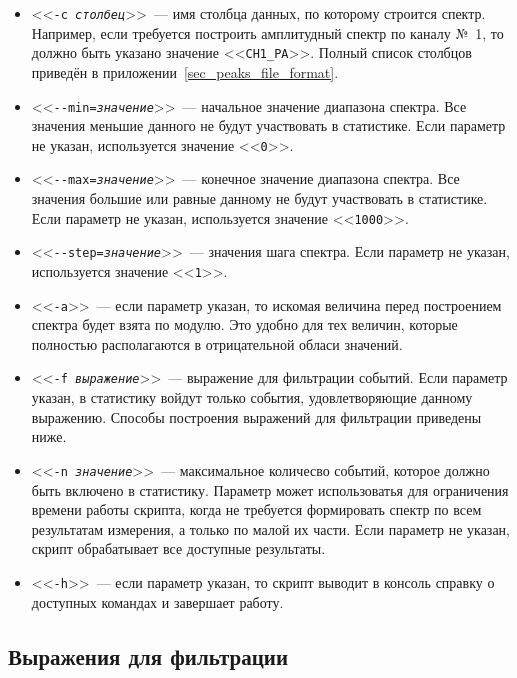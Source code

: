 \documentclass[12pt, a4paper, oneside, onecolumn]{book}
\newcommand{\CMDARG}[1]{<<{\tt #1}>>}
\begin{document}
\begin{itemize}

\item \CMDARG{-c {\it столбец}}~--- имя столбца данных, по которому строится спектр. Например, если требуется построить амплитудный спектр по каналу №~1, то должно быть указано значение \CMDARG{CH1\_PA}. Полный список столбцов приведён в приложении~\ref{sec_peaks_file_format}.

\item \CMDARG{-{}-min={\it значение}}~--- начальное значение диапазона спектра. Все значения меньшие данного не будут участвовать в статистике. Если параметр не указан, используется значение \CMDARG{0}.

\item \CMDARG{-{}-max={\it значение}}~--- конечное значение диапазона спектра. Все значения большие или равные данному не будут участвовать в статистике. Если параметр не указан, используется значение \CMDARG{1000}.

\item \CMDARG{-{}-step={\it значение}}~--- значения шага спектра. Если параметр не указан, используется значение \CMDARG{1}.

\item \CMDARG{-a}~--- если параметр указан, то искомая величина перед построением спектра будет взята по модулю. Это удобно для тех величин, которые полностью располагаются в отрицательной обласи значений.

\item \CMDARG{-f {\it выражение}}~--- выражение для фильтрации событий. Если параметр указан, в статистику войдут только события, удовлетворяющие данному выражению. Способы построения выражений для фильтрации приведены ниже.

\item \CMDARG{-n {\it значение}}~--- максимальное количесво событий, которое должно быть включено в статистику. Параметр может использоватья для ограничения времени работы скрипта, когда не требуется формировать спектр по всем результатам измерения, а только по малой их части. Если параметр не указан, скрипт обрабатывает все доступные результаты.

\item \CMDARG{-h}~--- если параметр указан, то скрипт выводит в консоль справку о доступных командах и завершает работу.

\end{itemize}

\subsection{Выражения для фильтрации}
\end{document}

